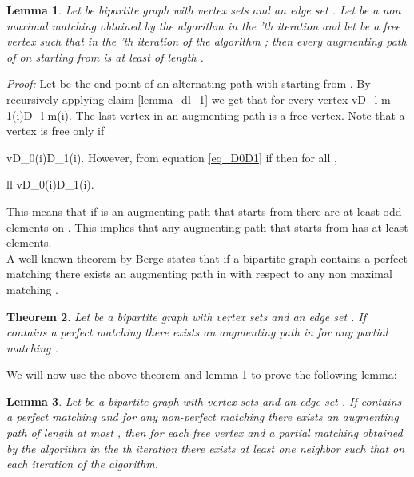 \documentclass[11pt,onecolumn]{article}
\newcounter{theorem}
\newtheorem{lemma}[theorem]{Lemma}
\newcommand{\beq}{}
\newcommand{\bea}{\begin{array}}
\newcommand{\ena}{\end{array}}
\newenvironment{proof}{\textit{Proof:}}{\hfill\\}
\newtheorem{theorem}{Theorem}
\begin{document}
\begin{lemma}
\label{lemma_max_h} Let  be bipartite graph with vertex sets  and an edge set . Let  be a non maximal matching obtained by the algorithm in the 'th iteration and let  be a free vertex such that in the 'th iteration of the algorithm ;  then every augmenting path of  on  starting from  is at least of length .
\end{lemma}

\begin{proof}
Let  be the end point of an alternating path  with  starting from .
By recursively applying claim \ref{lemma_dl_1} we get that for every vertex 
\beq\label{eq_D0D1}
v\not\in D_{l-m-1}(i)\setminus D_{l-m}(i).
\eeq
The last vertex in an augmenting path is a free vertex.
Note that a vertex  is free only if
\beq
v\in D_{0}(i)\setminus D_{1}(i).
\eeq
However, from equation \ref{eq_D0D1} if  then for all ,
\beq
\bea{ll}
v\not\in D_{0}(i)\setminus D_{1}(i).
\ena
\eeq
This means that if  is an augmenting path that starts from  there are at least  odd elements on  .
This implies that any augmenting path that starts from  has at least  elements.
\end{proof}
A well-known theorem by Berge \cite{berge1957two} states that if a bipartite graph  contains a perfect matching there exists an augmenting path in  with respect to any non maximal matching .
\begin{theorem}\cite{berge1957two}
 \label{theorem_augment}  Let  be a bipartite graph with vertex sets  and an edge set . If  contains a perfect matching there exists an augmenting path in  for any partial matching .
 \end{theorem}
We will now use the above theorem and lemma \ref{lemma_max_h} to prove the following lemma:
\begin{lemma}
 \label{lemma_neighbour_less_l} Let  be a bipartite graph with vertex sets  and an edge set . If  contains a perfect matching and for any non-perfect matching   there exists an augmenting path of length at most , then for each free vertex  and a partial matching  obtained by the algorithm in the th iteration there exists at least one neighbor  such that  on each iteration of the algorithm.
 \end{lemma}
\end{document}
